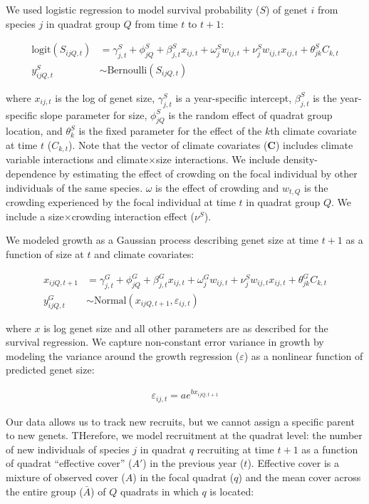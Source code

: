 \documentclass[12pt,]{article}
\begin{document}
We used logistic regression to model survival probability (\(S\)) of
genet \(i\) from species \(j\) in quadrat group \(Q\) from time \(t\) to
\(t+1\):

\begin{align}
\text{logit}(S_{ijQ,t}) &= \gamma^{S}_{j,t} + \phi^{S}_{jQ} + \beta^{S}_{j,t}x_{ij,t} + \omega^{S}_{j}w_{ij,t} + \nu^{S}_{j}w_{ij,t}x_{ij,t} + \theta^{S}_{jk}C_{k,t} \\
y^{S}_{ijQ,t} &\sim \text{Bernoulli}(S_{ijQ,t})
\end{align}

where \(x_{ij,t}\) is the log of genet size, \(\gamma^{S}_{j,t}\) is a
year-specific intercept, \(\beta^{S}_{j,t}\) is the year-specific slope
parameter for size, \(\phi^{S}_{jQ}\) is the random effect of quadrat
group location, and \(\theta^{S}_{k}\) is the fixed parameter for the
effect of the \(k\)th climate covariate at time \(t\) (\(C_{k,t}\)).
Note that the vector of climate covariates (\textbf{C}) includes climate
variable interactions and climate\(\times\)size interactions. We include
density-dependence by estimating the effect of crowding on the focal
individual by other individuals of the same species. \(\omega\) is the
effect of crowding and \(w_{t,Q}\) is the crowding experienced by the
focal individual at time \(t\) in quadrat group \(Q\). We include a
size\(\times\)crowding interaction effect (\(\nu^{S}\)).

We modeled growth as a Gaussian process describing genet size at time
\(t+1\) as a function of size at \(t\) and climate covariates:

\begin{align}
x_{ijQ,t+1} &= \gamma^{G}_{j,t} + \phi^{G}_{jQ} + \beta^{G}_{j,t}x_{ij,t} + \omega^{G}_{j}w_{ij,t} + \nu^{S}_{j}w_{ij,t}x_{ij,t} + \theta^{G}_{jk}C_{k,t} \\
y^{G}_{ijQ,t} &\sim \text{Normal}(x_{ijQ,t+1}, \varepsilon_{ij,t})
\end{align}

where \(x\) is log genet size and all other parameters are as described
for the survival regression. We capture non-constant error variance in
growth by modeling the variance around the growth regression
(\(\varepsilon\)) as a nonlinear function of predicted genet size:

\begin{align}
\varepsilon_{ij,t} = a e^{b x_{ijQ,t+1}}
\end{align}

Our data allows us to track new recruits, but we cannot assign a
specific parent to new genets. THerefore, we model recruitment at the
quadrat level: the number of new individuals of species \(j\) in quadrat
\(q\) recruiting at time \(t+1\) as a function of quadrat ``effective
cover'' (\(A'\)) in the previous year (\(t\)). Effective cover is a
mixture of observed cover (\(A\)) in the focal quadrat (\(q\)) and the
mean cover across the entire group (\(\bar{A}\)) of \(Q\) quadrats in
which \(q\) is located:
\end{document}
